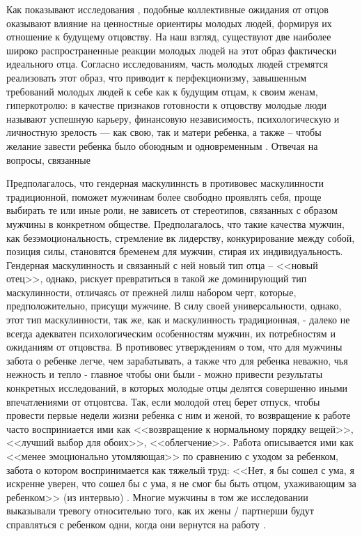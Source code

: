 \documentclass{../../common/thesisbyxetex}
\begin{document}
Как показывают исследования \cite{imaf}, подобные коллективные ожидания от отцов
оказывают влияние на ценностные ориентиры молодых людей, формируя их отношение к будущему
отцовству.  На наш взгляд, существуют две наиболее широко распространенные реакции
молодых людей на этот образ фактически идеального отца. Согласно исследованиям, часть молодых людей
стремятся реализовать этот образ, что приводит к перфекционизму, завышенным требований молодых
людей к себе как к будущим отцам, к своим женам, гиперкотролю: в качестве признаков
готовности к отцовству молодые люди называют успешную карьеру, финансовую независимость,
психологическую и личностную зрелость --- как свою, так и матери ребенка, а также -- чтобы желание
завести ребенка было обоюдным и одновременным \cite{imaf}. Отвечая на вопросы, связанные

Предполагалось, что гендерная маскулиннсть
в противовес маскулинности традиционной, поможет мужчинам более свободно проявлять себя, проще
выбирать те или иные роли, не зависеть от стереотипов, связанных с образом мужчины в конкретном
обществе. Предполагалось, что такие качества мужчин, как безэмоциональность, стремление вк
лидерству, конкурирование между собой, позиция силы, становятся бременем для мужчин,
стирая их индивидуальность. Гендерная маскулинность и связанный с ней новый тип отца -- <<новый
отец>>, однако, рискует превратиться в такой же доминирующий тип маскулинности, отличаясь от
прежней лилш набором черт, которые,  предположительно, присущи мужчине. В силу своей
универсальности, однако, этот тип маскулинности, так же, как и маскулинность традиционная, -
далеко не всегда адекватен психологическим особенностям мужчин, их  потребностям и ожиданиям
от отцовства.  В противовес утверждениям о том, что для мужчины забота о ребенке легче,
чем зарабатывать, а также что для ребенка неважно, чья нежность и тепло - главное чтобы они были -
можно привести результаты конкретных исследований, в которых молодые отцы делятся совершенно иными
впечатлениями от отцовтсва. Так, если молодой отец берет отпуск, чтобы провести первые
недели жизни ребенка с ним и женой, то возвращение к работе часто восприниается ими как
<<возвращение к нормальному порядку вещей>>, <<лучший выбор для обоих>>, <<облегчение>>. Работа
описывается ими как <<менее эмоционально утомляющая>> по сравнению с уходом за ребенком, забота о
котором воспринимается как тяжелый труд: <<Нет, я бы сошел с ума, я искренне уверен, что сошел бы
с ума, я не смог бы быть отцом, ухаживающим за ребенком>> (из интервью) \cite[370-371]{tri}. Многие
мужчины в том же исследовании выказывали тревогу относительно того, как их жены / партнерши будут
справляться с ребенком одни, когда они вернутся на работу  \cite[370-371]{tri}.
\end{document}
